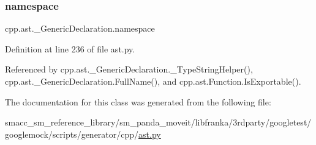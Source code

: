 \mbox{\label{classcpp_1_1ast_1_1__GenericDeclaration_a8aee3f11b37449d54b42a78e0a689f46}} 
\subsubsection{\texorpdfstring{namespace}{namespace}}
{\footnotesize\ttfamily cpp.\+ast.\+\_\+\+Generic\+Declaration.\+namespace}



Definition at line 236 of file ast.\+py.



Referenced by cpp.\+ast.\+\_\+\+Generic\+Declaration.\+\_\+\+Type\+String\+Helper(), cpp.\+ast.\+\_\+\+Generic\+Declaration.\+Full\+Name(), and cpp.\+ast.\+Function.\+Is\+Exportable().



The documentation for this class was generated from the following file\+:\begin{DoxyCompactItemize}
\item 
smacc\+\_\+sm\+\_\+reference\+\_\+library/sm\+\_\+panda\+\_\+moveit/libfranka/3rdparty/googletest/googlemock/scripts/generator/cpp/\hyperlink{ast_8py}{ast.\+py}\end{DoxyCompactItemize}
